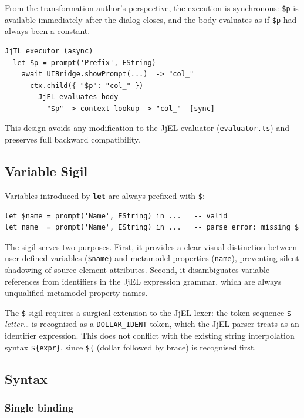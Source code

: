 \documentclass[11pt,a4paper]{article}
\newcommand{\jjel}{\textsf{JjEL}}
\newcommand{\kw}[1]{\texttt{\textbf{#1}}}
\begin{document}
From the transformation author's perspective, the execution is
synchronous: \texttt{\$p} is available immediately after the dialog
closes, and the body evaluates as if \texttt{\$p} had always been
a constant.

\begin{lstlisting}[style=grammar,caption={JjLet execution flow}]
JjTL executor (async)
  let $p = prompt('Prefix', EString)
    await UIBridge.showPrompt(...)  -> "col_"
      ctx.child({ "$p": "col_" })
        JjEL evaluates body
          "$p" -> context lookup -> "col_"  [sync]
\end{lstlisting}

This design avoids any modification to the \jjel{} evaluator
(\texttt{evaluator.ts}) and preserves full backward compatibility.


\subsection{Variable Sigil}

Variables introduced by \kw{let} are always prefixed with \texttt{\$}:

\begin{lstlisting}[style=jjel,numbers=none]
let $name = prompt('Name', EString) in ...   -- valid
let name  = prompt('Name', EString) in ...   -- parse error: missing $
\end{lstlisting}

The sigil serves two purposes. First, it provides a clear visual
distinction between user-defined variables (\texttt{\$name}) and
metamodel properties (\texttt{name}), preventing silent shadowing of
source element attributes. Second, it disambiguates variable references
from identifiers in the JjEL expression grammar, which are always
unqualified metamodel property names.

The \texttt{\$} sigil requires a surgical extension to the \jjel{}
lexer: the token sequence \texttt{\$}\,\textit{letter\ldots} is
recognised as a \texttt{DOLLAR\_IDENT} token, which the \jjel{} parser
treats as an identifier expression. This does not conflict with the
existing string interpolation syntax \texttt{\$\{expr\}}, since
\texttt{\$\{} (dollar followed by brace) is recognised first.


\subsection{Syntax}

\subsubsection{Single binding}
\end{document}
